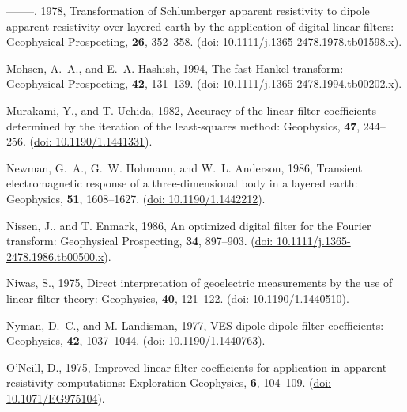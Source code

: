 \documentclass[paper,twocolumn,twoside]{geophysics}
\begin{document}
\begin{thebibliography}{}
--------, 1978, Transformation of {S}chlumberger apparent resistivity to dipole
  apparent resistivity over layered earth by the application of digital linear
  filters: Geophysical Prospecting, {\bf 26}, 352--358.
\newblock (\href{https://doi.org/10.1111/j.1365-2478.1978.tb01598.x}{doi:
  10.1111/j.1365-2478.1978.tb01598.x}).

Mohsen, A.~A., and E.~A. Hashish,  1994, The fast {H}ankel transform:
  Geophysical Prospecting, {\bf 42}, 131--139.
\newblock (\href{https://doi.org/10.1111/j.1365-2478.1994.tb00202.x}{doi:
  10.1111/j.1365-2478.1994.tb00202.x}).

Murakami, Y., and T. Uchida,  1982, Accuracy of the linear filter coefficients
  determined by the iteration of the least-squares method: Geophysics, {\bf
  47}, 244--256.
\newblock (\href{https://doi.org/10.1190/1.1441331}{doi: 10.1190/1.1441331}).

Newman, G.~A., G.~W. Hohmann, and W.~L. Anderson,  1986, Transient
  electromagnetic response of a three-dimensional body in a layered earth:
  Geophysics, {\bf 51}, 1608--1627.
\newblock (\href{https://doi.org/10.1190/1.1442212}{doi: 10.1190/1.1442212}).

Nissen, J., and T. Enmark,  1986, An optimized digital filter for the {F}ourier
  transform: Geophysical Prospecting, {\bf 34}, 897--903.
\newblock (\href{https://doi.org/10.1111/j.1365-2478.1986.tb00500.x}{doi:
  10.1111/j.1365-2478.1986.tb00500.x}).

Niwas, S.,  1975, Direct interpretation of geoelectric measurements by the use
  of linear filter theory: Geophysics, {\bf 40}, 121--122.
\newblock (\href{https://doi.org/10.1190/1.1440510}{doi: 10.1190/1.1440510}).

Nyman, D.~C., and M. Landisman,  1977, {VES} dipole-dipole filter coefficients:
  Geophysics, {\bf 42}, 1037--1044.
\newblock (\href{https://doi.org/10.1190/1.1440763}{doi: 10.1190/1.1440763}).

O'Neill, D.,  1975, Improved linear filter coefficients for application in
  apparent resistivity computations: Exploration Geophysics, {\bf 6}, 104--109.
\newblock (\href{https://doi.org/10.1071/EG975104}{doi: 10.1071/EG975104}).


\end{thebibliography}
\end{document}
